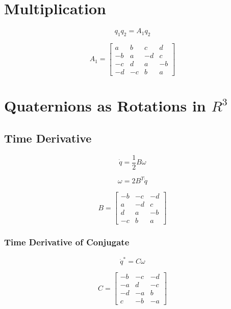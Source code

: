 \documentclass{article}
\begin{document}
\section{Multiplication}

\[
q_1 q_2 = A_1 q_2
\]

\[
A_1
= \begin{bmatrix}
 a &  b &  c &  d \\
-b &  a & -d &  c \\
-c &  d &  a & -b \\
-d & -c &  b &  a
\end{bmatrix}
\]

\section{Quaternions as Rotations in ${R}^3$}

\subsection{Time Derivative}

\[
\dot{q} = \frac{1}{2} B \omega
\]

\[
\omega = 2 B^T \dot{q}
\]

\[
B
= \begin{bmatrix}
-b & -c & -d \\
 a & -d &  c \\
 d &  a & -b \\
-c &  b &  a
\end{bmatrix}
\]

\subsubsection{Time Derivative of Conjugate}

\[
\dot{q}^* = C \omega
\]

\[
C
= \begin{bmatrix}
-b & -c & -d \\
-a &  d & -c \\
-d & -a &  b \\
 c & -b & -a
\end{bmatrix}
\]
\end{document}
